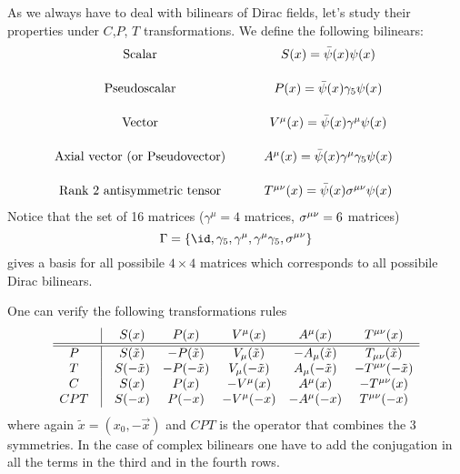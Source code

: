 \documentclass[TheoreticalPhy_ModB.tex]{subfiles}
\begin{document}
As we always have to deal with bilinears of Dirac fields, let's study their properties under $C$,$P$, $T$ transformations. We define the following bilinears:
\[\begin{matrix}\text{Scalar}&\quad&S(x)=\bar\psi(x)\psi(x)\vspace{0.5cm}\\
\text{Pseudoscalar}&&P(x)=\bar\psi(x)\gamma_5\psi(x)\vspace{0.5cm}\\
\text{Vector}&&V^\mu(x)=\bar\psi(x)\gamma^\mu\psi(x)\vspace{0.5cm}\\
\text{Axial vector (or Pseudovector)}&&A^\mu(x)=\bar\psi(x)\gamma^\mu\gamma_5\psi(x)\vspace{0.5cm}\\
\text{Rank 2 antisymmetric tensor}&&T^\mn(x)=\bar\psi(x)\sigma^\mn\psi(x)&&\\\end{matrix}\]
%
Notice that the set of 16 matrices ($\gamma^\mu=4$ matrices, $\sigma^{\mu\nu}=6$ matrices)
\[\Gamma=\{\id,\gamma_5,\gamma^\mu,\gamma^\mu\gamma_5,\sigma^\mn\}\]
gives a basis for all possibile $4\times4$ matrices which corresponds to all possibile Dirac bilinears.

One can verify the following transformations rules
%
\[
\begin{matrix}
  &\vline& S(x) & P(x)  & V^\mu(x)  & A^\mu(x)  & T^\mn(x)  \\
\hline\hline
P  &\vline& S(\tilde x)  & -P(\tilde x)  & V_\mu(\tilde x)  & -A_\mu(\tilde x)  & T_\mn(\tilde x)  \\
T  &\vline& S(-\tilde x)  & -P(-\tilde x)  & V_\mu(-\tilde x)  & A_\mu(-\tilde x)  & -T^\mn(-\tilde x)  \\
C  &\vline& S(x)  & P(x)  & -V^\mu(x)  & A^\mu(x)  & -T^\mn(x)  \\
CPT  &\vline& S(-x)  & P(-x)  & -V^\mu(-x)  & -A^\mu(-x)  &   T^\mn(-x) 
\end{matrix}
\]
where again $\tilde x=(x_0,-\vec x)$ and $CPT$ is the operator that combines the 3 symmetries. In the case of complex bilinears one have to add the conjugation in all the terms in the third and in the fourth rows.  
 
\end{document}
